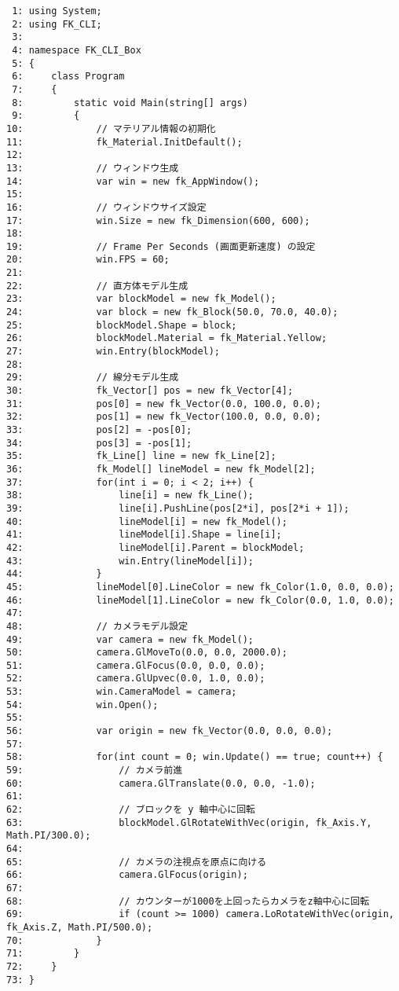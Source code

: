 \begin{breakbox}
\begin{small}
\begin{verbatim}
 1: using System;
 2: using FK_CLI;
 3: 
 4: namespace FK_CLI_Box
 5: {
 6:     class Program
 7:     {
 8:         static void Main(string[] args)
 9:         {
10:             // マテリアル情報の初期化
11:             fk_Material.InitDefault();
12: 
13:             // ウィンドウ生成
14:             var win = new fk_AppWindow();
15: 
16:             // ウィンドウサイズ設定
17:             win.Size = new fk_Dimension(600, 600);
18: 
19:             // Frame Per Seconds (画面更新速度) の設定
20:             win.FPS = 60;
21: 
22:             // 直方体モデル生成
23:             var blockModel = new fk_Model();
24:             var block = new fk_Block(50.0, 70.0, 40.0);
25:             blockModel.Shape = block;
26:             blockModel.Material = fk_Material.Yellow;
27:             win.Entry(blockModel);
28: 
29:             // 線分モデル生成
30:             fk_Vector[] pos = new fk_Vector[4];
31:             pos[0] = new fk_Vector(0.0, 100.0, 0.0);
32:             pos[1] = new fk_Vector(100.0, 0.0, 0.0);
33:             pos[2] = -pos[0];
34:             pos[3] = -pos[1];
35:             fk_Line[] line = new fk_Line[2];
36:             fk_Model[] lineModel = new fk_Model[2];
37:             for(int i = 0; i < 2; i++) {
38:                 line[i] = new fk_Line();
39:                 line[i].PushLine(pos[2*i], pos[2*i + 1]);
40:                 lineModel[i] = new fk_Model();
41:                 lineModel[i].Shape = line[i];
42:                 lineModel[i].Parent = blockModel;
43:                 win.Entry(lineModel[i]);
44:             }
45:             lineModel[0].LineColor = new fk_Color(1.0, 0.0, 0.0);
46:             lineModel[1].LineColor = new fk_Color(0.0, 1.0, 0.0);
47: 
48:             // カメラモデル設定
49:             var camera = new fk_Model();
50:             camera.GlMoveTo(0.0, 0.0, 2000.0);
51:             camera.GlFocus(0.0, 0.0, 0.0);
52:             camera.GlUpvec(0.0, 1.0, 0.0);
53:             win.CameraModel = camera;
54:             win.Open();
55: 
56:             var origin = new fk_Vector(0.0, 0.0, 0.0);
57: 
58:             for(int count = 0; win.Update() == true; count++) {
59:                 // カメラ前進
60:                 camera.GlTranslate(0.0, 0.0, -1.0);
61: 
62:                 // ブロックを y 軸中心に回転
63:                 blockModel.GlRotateWithVec(origin, fk_Axis.Y, Math.PI/300.0);
64: 
65:                 // カメラの注視点を原点に向ける
66:                 camera.GlFocus(origin);
67: 
68:                 // カウンターが1000を上回ったらカメラをz軸中心に回転
69:                 if (count >= 1000) camera.LoRotateWithVec(origin, fk_Axis.Z, Math.PI/500.0);
70:             }
71:         }
72:     }
73: }
\end{verbatim}
\end{small}
\end{breakbox}
~

